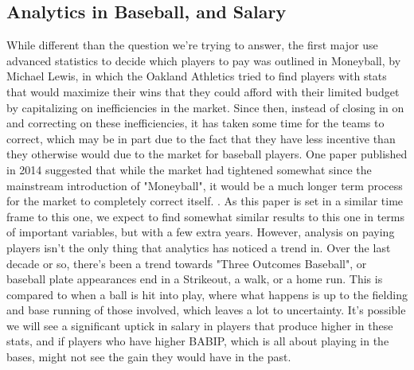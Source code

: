 \documentclass{article}
\begin{document}
\subsection{Analytics in Baseball, and Salary}
While different than the question we're trying to answer, the first major use advanced statistics to decide which players to pay was outlined in Moneyball, by Michael Lewis, in which the Oakland Athletics tried to find players with stats that would maximize their wins that they could afford with their limited budget by capitalizing on inefficiencies in the market. \citet{lewis2003moneyball} Since then, instead of closing in on and correcting on these inefficiencies, it has taken some time for the teams to correct, which may be in part due to the fact that they have less incentive than they otherwise would due to the market for baseball players. One paper published in 2014 suggested that while the market had tightened somewhat since the mainstream introduction of "Moneyball", it would be a much longer term process for the market to completely correct itself. \citet{baumer2014market}. As this paper is set in a similar time frame to this one, we expect to find somewhat similar results to this one in terms of important variables, but with a few extra years. However, analysis on paying players isn't the only thing that analytics has noticed a trend in. Over the last decade or so, there's been a trend towards "Three Outcomes Baseball", or baseball plate appearances end in a Strikeout, a walk, or a home run. This is compared to when a ball is hit into play, where what happens is up to the fielding and base running of those involved, which leaves a lot to uncertainty. It's possible we will see a significant uptick in salary in players that produce higher in these stats, and if players who have higher BABIP, which is all about playing in the bases, might not see the gain they would have in the past.
\end{document}
